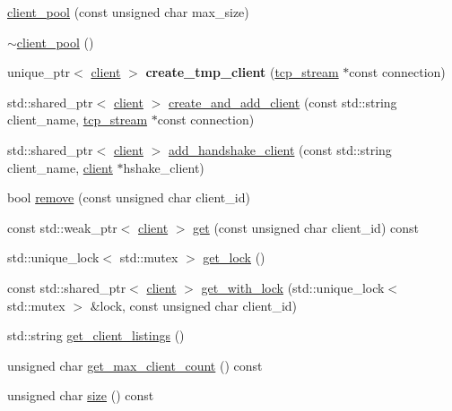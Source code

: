 \begin{DoxyCompactItemize}
\item 
\hyperlink{classbattleship_1_1game__server_1_1client__pool_a9ffedd30a826545efa028e0043e9fe76}{client\+\_\+pool} (const unsigned char max\+\_\+size)
\item 
\hyperlink{classbattleship_1_1game__server_1_1client__pool_abf33396f0871941b9adda5e7e2cab62a}{$\sim$client\+\_\+pool} ()
\item 
\mbox{\label{classbattleship_1_1game__server_1_1client__pool_a63a4049da20aeefd21f415c9cfd9705a}} 
unique\+\_\+ptr$<$ \hyperlink{classbattleship_1_1game__server_1_1client}{client} $>$ {\bfseries create\+\_\+tmp\+\_\+client} (\hyperlink{classtcp__stream}{tcp\+\_\+stream} $\ast$const connection)
\item 
std\+::shared\+\_\+ptr$<$ \hyperlink{classbattleship_1_1game__server_1_1client}{client} $>$ \hyperlink{classbattleship_1_1game__server_1_1client__pool_a12783bea5e12502d8508cfd1940523f4}{create\+\_\+and\+\_\+add\+\_\+client} (const std\+::string client\+\_\+name, \hyperlink{classtcp__stream}{tcp\+\_\+stream} $\ast$const connection)
\item 
std\+::shared\+\_\+ptr$<$ \hyperlink{classbattleship_1_1game__server_1_1client}{client} $>$ \hyperlink{classbattleship_1_1game__server_1_1client__pool_a08f63f68adf4fb458e0e3bc8336a19d2}{add\+\_\+handshake\+\_\+client} (const std\+::string client\+\_\+name, \hyperlink{classbattleship_1_1game__server_1_1client}{client} $\ast$hshake\+\_\+client)
\item 
bool \hyperlink{classbattleship_1_1game__server_1_1client__pool_ab16b4cb64048ba0974f5a792bfe1c15b}{remove} (const unsigned char client\+\_\+id)
\item 
const std\+::weak\+\_\+ptr$<$ \hyperlink{classbattleship_1_1game__server_1_1client}{client} $>$ \hyperlink{classbattleship_1_1game__server_1_1client__pool_a39d1db920be949755ebe64b50d2bff96}{get} (const unsigned char client\+\_\+id) const
\item 
std\+::unique\+\_\+lock$<$ std\+::mutex $>$ \hyperlink{classbattleship_1_1game__server_1_1client__pool_a6feaf8b0a5c743aa411c2c82be229689}{get\+\_\+lock} ()
\item 
const std\+::shared\+\_\+ptr$<$ \hyperlink{classbattleship_1_1game__server_1_1client}{client} $>$ \hyperlink{classbattleship_1_1game__server_1_1client__pool_ab8282d54f2e950f6625508a274dd96d9}{get\+\_\+with\+\_\+lock} (std\+::unique\+\_\+lock$<$ std\+::mutex $>$ \&lock, const unsigned char client\+\_\+id)
\item 
std\+::string \hyperlink{classbattleship_1_1game__server_1_1client__pool_a32441e47a79b098bb67261b18656bc7e}{get\+\_\+client\+\_\+listings} ()
\item 
unsigned char \hyperlink{classbattleship_1_1game__server_1_1client__pool_aae696f6646de671fd02ff305b728870c}{get\+\_\+max\+\_\+client\+\_\+count} () const
\item 
unsigned char \hyperlink{classbattleship_1_1game__server_1_1client__pool_a4e90204ab16b5884148bbb41fe2c00df}{size} () const
\end{DoxyCompactItemize}


